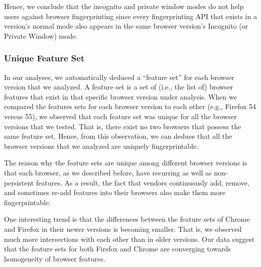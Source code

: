Hence, we conclude that the incognito and private window modes do not help
users against browser fingerprinting since every fingerprinting API that exists
in a version's normal mode also appears in the same browser version's Incognito
(or Private Window) mode.

\subsubsection{Unique Feature Set}

In our analyses, we automatically deduced a ``feature set'' for each
browser version that we analyzed. A feature set is a set of (i.e., the
list of) browser features that exist in that specific browser version
under analysis. When we compared the features sets for each browser
version to each other (e.g., Firefox 54 versus 55), we observed that
each feature set was unique for all the browser versions that we
tested. That is, there exist no two browsers that possess the same
feature set. Hence, from this observation, we can deduce that all the
browser versions that we analyzed are uniquely fingerprintable.

The reason why the feature sets are unique among different browser
versions is that each browser, as we described before, have recurring
as well as non-persistent features. As a result, the fact that vendors
continuously add, remove, and sometimes re-add features into their
browsers also make them more fingerprintable.


One interesting trend is that the differences between the feature sets
of Chrome and Firefox in their newer versions is becoming smaller.
That is, we observed much more intersections with each other than in
older versions. Our data suggest that the feature sets for both
Firefox and Chrome are converging towards homogeneity of browser
features.

